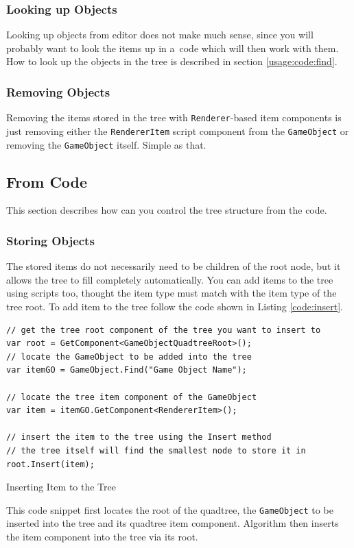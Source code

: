 \documentclass{article}
\begin{document}
\subsubsection{Looking up Objects} \label{usage:editor:find}
Looking up objects from editor does not make much sense, since you will probably want to look the items up in a~code which will then work with them.
How to look up the objects in the tree is described in section \ref{usage:code:find}.

\subsubsection{Removing Objects} \label{usage:editor:remove}
Removing the items stored in the tree with \texttt{Renderer}-based item components is just removing either the \texttt{RendererItem} script component from the \texttt{GameObject} or removing the \texttt{GameObject} itself.
Simple as that.

\subsection{From Code} \label{usage:code}
This section describes how can you control the tree structure from the code.

\subsubsection{Storing Objects} \label{usage:code:store}
The stored items do not necessarily need to be children of the root node, but it allows the tree to fill completely automatically.
You can add items to the tree using scripts too, thought the item type must match with the item type of the tree root.
To add item to the tree follow the code shown in Listing \ref{code:insert}.

\begin{listing}[H]
    \begin{verbatim}
// get the tree root component of the tree you want to insert to
var root = GetComponent<GameObjectQuadtreeRoot>();
// locate the GameObject to be added into the tree
var itemGO = GameObject.Find("Game Object Name");

// locate the tree item component of the GameObject
var item = itemGO.GetComponent<RendererItem>();

// insert the item to the tree using the Insert method
// the tree itself will find the smallest node to store it in
root.Insert(item);
    \end{verbatim}
    \vspace{-1em}
    \caption{Inserting Item to the Tree} \label{code:insert}
    \smallskip\small\centering
    This code snippet first locates the root of the quadtree, the \texttt{GameObject} to be inserted into the tree and its quadtree item component.
    Algorithm then inserts the item component into the tree via its root.
\end{listing}
\end{document}
